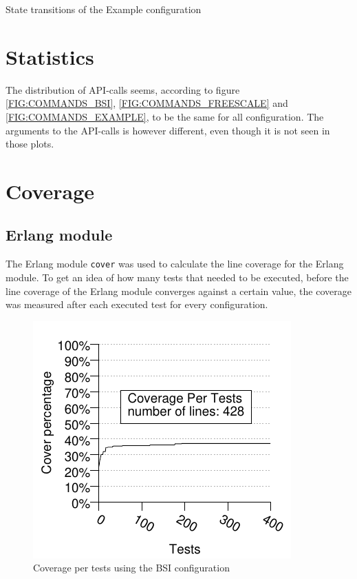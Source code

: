 \begin{table}[!ht]
  \caption{State transitions of the Example configuration}
  \label{TABLE:STATUSES_EXAMPLE}
  
\end{table}

\section{Statistics}
The distribution of API-calls seems, according to figure
\ref{FIG:COMMANDS_BSI}, \ref{FIG:COMMANDS_FREESCALE} and
\ref{FIG:COMMANDS_EXAMPLE}, to be the same for all configuration. The
arguments to the API-calls is however different, even though it is not
seen in those plots.

\section{Coverage}
\label{SEC:COVERAGE}
\subsection{Erlang module}
\newcommand{\linecoverage}{97.38\%}
\newcommand{\bullseyecoverage}{85.64\%}
The Erlang module \lstinline!cover! was used to calculate the line
coverage for the Erlang module. To get an idea of how many tests that
needed to be executed, before the line coverage of the Erlang module
converges against a certain value, the coverage was measured after
each executed test for every configuration.

\begin{figure}[!ht]
\begin{center}
\includegraphics{generated_pictures/coverage_per_tests_bsi.pdf}
\end{center}
\caption{Coverage per tests using the BSI configuration}
\label{FIG:COV_PER_TESTS_BSI}
\end{figure}

